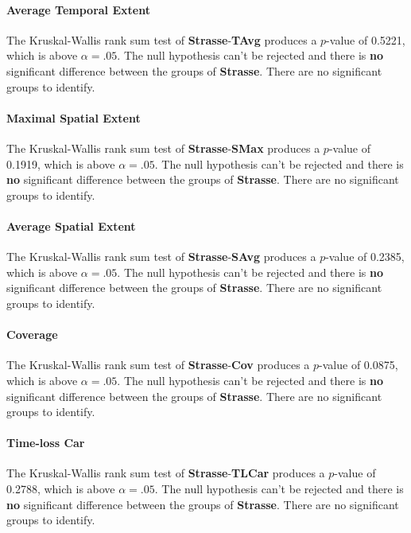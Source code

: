 \paragraph{Average Temporal Extent}
The Kruskal-Wallis rank sum test of \textbf{Strasse}-\textbf{TAvg} produces a $p$-value of 0.5221, which is above $\alpha=.05$. The null hypothesis can't be rejected and there is \textbf{no} significant difference between the groups of \textbf{Strasse}. There are no significant groups to identify.

\paragraph{Maximal Spatial Extent}
The Kruskal-Wallis rank sum test of \textbf{Strasse}-\textbf{SMax} produces a $p$-value of 0.1919, which is above $\alpha=.05$. The null hypothesis can't be rejected and there is \textbf{no} significant difference between the groups of \textbf{Strasse}. There are no significant groups to identify.

\paragraph{Average Spatial Extent}
The Kruskal-Wallis rank sum test of \textbf{Strasse}-\textbf{SAvg} produces a $p$-value of 0.2385, which is above $\alpha=.05$. The null hypothesis can't be rejected and there is \textbf{no} significant difference between the groups of \textbf{Strasse}. There are no significant groups to identify.

\paragraph{Coverage}
The Kruskal-Wallis rank sum test of \textbf{Strasse}-\textbf{Cov} produces a $p$-value of 0.0875, which is above $\alpha=.05$. The null hypothesis can't be rejected and there is \textbf{no} significant difference between the groups of \textbf{Strasse}. There are no significant groups to identify.

\paragraph{Time-loss Car}
The Kruskal-Wallis rank sum test of \textbf{Strasse}-\textbf{TLCar} produces a $p$-value of 0.2788, which is above $\alpha=.05$. The null hypothesis can't be rejected and there is \textbf{no} significant difference between the groups of \textbf{Strasse}. There are no significant groups to identify.

